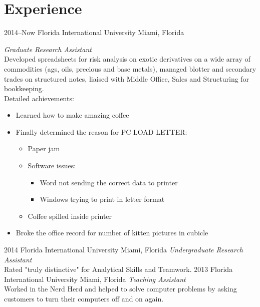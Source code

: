 \documentclass[]{friggeri-cv} %
\begin{document}

\section{Experience}

\begin{entrylist}
\entry
{2014--Now}
{Florida International University}
{Miami, Florida}
{\emph{Graduate Research Assistant} \\
Developed spreadsheets for risk analysis on exotic derivatives on a wide array of commodities (ags, oils, precious and base metals), managed blotter and secondary trades on structured notes, liaised with Middle Office, Sales and Structuring for bookkeeping. \\
Detailed achievements:
\begin{itemize}
\item Learned how to make amazing coffee
\item Finally determined the reason for \textsc{PC LOAD LETTER}:
\begin{itemize}
\item Paper jam
\item Software issues:
\begin{itemize}
\item Word not sending the correct data to printer
\item Windows trying to print in letter format
\end{itemize}
\item Coffee spilled inside printer
\end{itemize}
\item Broke the office record for number of kitten pictures in cubicle
\end{itemize}}
\entry
{2014}
{Florida International University}
{Miami, Florida}
{\emph{Undergraduate Research Assistant} \\
Rated "truly distinctive" for Analytical Skills and Teamwork.}
\entry
{2013}
{Florida International University}
{Miami, Florida}
{\emph{Teaching Assistant} \\
Worked in the Nerd Herd and helped to solve computer problems by asking customers to turn their computers off and on again.}
\end{entrylist}
\end{document}
